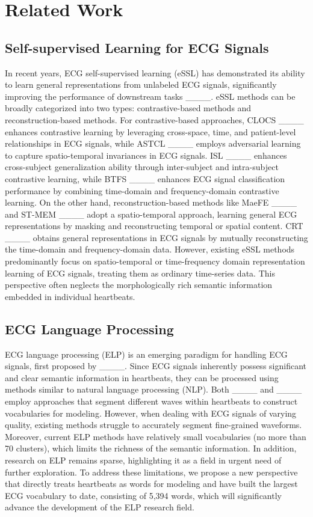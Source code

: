\section{Related Work}
\subsection{Self-supervised Learning for ECG Signals}
In recent years, ECG self-supervised learning (eSSL) has demonstrated its ability to learn general representations from unlabeled ECG signals, significantly improving the performance of downstream tasks ____. eSSL methods can be broadly categorized into two types: contrastive-based methods and reconstruction-based methods. For contrastive-based approaches, CLOCS ____ enhances contrastive learning by leveraging cross-space, time, and patient-level relationships in ECG signals, while ASTCL ____ employs adversarial learning to capture spatio-temporal invariances in ECG signals. ISL ____ enhances cross-subject generalization ability through inter-subject and intra-subject contrastive learning, while BTFS ____ enhances ECG signal classification performance by combining time-domain and frequency-domain contrastive learning. On the other hand, reconstruction-based methods like MaeFE ____ and ST-MEM ____ adopt a spatio-temporal approach, learning general ECG representations by masking and reconstructing temporal or spatial content. CRT ____ obtains general representations in ECG signals by mutually reconstructing the time-domain and frequency-domain data.  However, existing eSSL methods predominantly focus on spatio-temporal or time-frequency domain representation learning of ECG signals, treating them as ordinary time-series data. This perspective often neglects the morphologically rich semantic information embedded in individual heartbeats.






\subsection{ECG Language Processing}

ECG language processing (ELP) is an emerging paradigm for handling ECG signals, first proposed by ____. Since ECG signals inherently possess significant and clear semantic information in heartbeats, they can be processed using methods similar to natural language processing (NLP). Both ____ and ____ employ approaches that segment different waves within heartbeats to construct vocabularies for modeling. However, when dealing with ECG signals of varying quality, existing methods struggle to accurately segment fine-grained waveforms. Moreover, current ELP methods have relatively small vocabularies (no more than 70 clusters), which limits the richness of the semantic information. In addition, research on ELP remains sparse, highlighting it as a field in urgent need of further exploration. To address these limitations, we propose a new perspective that directly treats heartbeats as words for modeling and have built the largest ECG vocabulary to date, consisting of 5,394 words, which will significantly advance the development of the ELP research field.